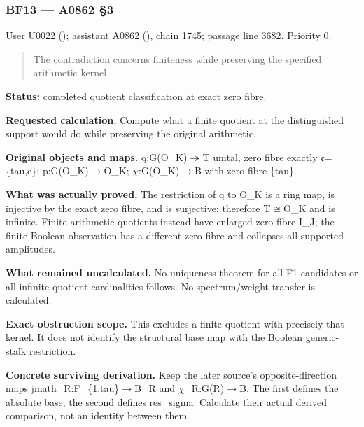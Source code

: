 \documentclass[10pt,a4paper,oneside]{report}
\begin{document}
\subsubsection{BF13 --- A0862 §3}\label{bf13-a0862-3}

User U0022 (\protect{});
assistant A0862 (\protect{}),
chain 1745; passage line 3682. Priority 0.

\begin{quote}
The contradiction concerns finiteness while preserving the specified
arithmetic kernel
\end{quote}

\textbf{Status:} completed quotient classification at exact zero fibre.

\textbf{Requested calculation.} Compute what a finite quotient at the
distinguished support would do while preserving the original arithmetic.

\textbf{Original objects and maps.}
q:G(O\_K)\allowbreak{}\ensuremath{↠}\allowbreak{}T unital, zero fibre
exactly \allowbreak{}\ensuremath{𝔢}\allowbreak{}=\{tau,e\};
p:G(O\_K)\allowbreak{}\ensuremath{→}\allowbreak{}O\_K;
\allowbreak{}\ensuremath{χ}\allowbreak{}:G(O\_K)\allowbreak{}\ensuremath{→}\allowbreak{}B
with zero fibre \{tau\}.

\textbf{What was actually proved.} The restriction of q to O\_K is a
ring map, is injective by the exact zero fibre, and is surjective;
therefore T\allowbreak{}\ensuremath{≅}\allowbreak{}O\_K and is infinite.
Finite arithmetic quotients instead have enlarged zero fibre I\_J; the
finite Boolean observation has a different zero fibre and collapses all
supported amplitudes.

\textbf{What remained uncalculated.} No uniqueness theorem for all F1
candidates or all infinite quotient cardinalities follows. No
spectrum/weight transfer is calculated.

\textbf{Exact obstruction scope.} This excludes a finite quotient with
precisely that kernel. It does not identify the structural base map with
the Boolean generic-stalk restriction.

\textbf{Concrete surviving derivation.} Keep the later source's
opposite-direction maps
jmath\_R:F\_\{1,tau\}\allowbreak{}\ensuremath{→}\allowbreak{}B\_R and
\allowbreak{}\ensuremath{χ}\allowbreak{}\_R:G(R)\allowbreak{}\ensuremath{→}\allowbreak{}B.
The first defines the absolute base; the second defines res\_sigma.
Calculate their actual derived comparison, not an identity between them.
\end{document}
